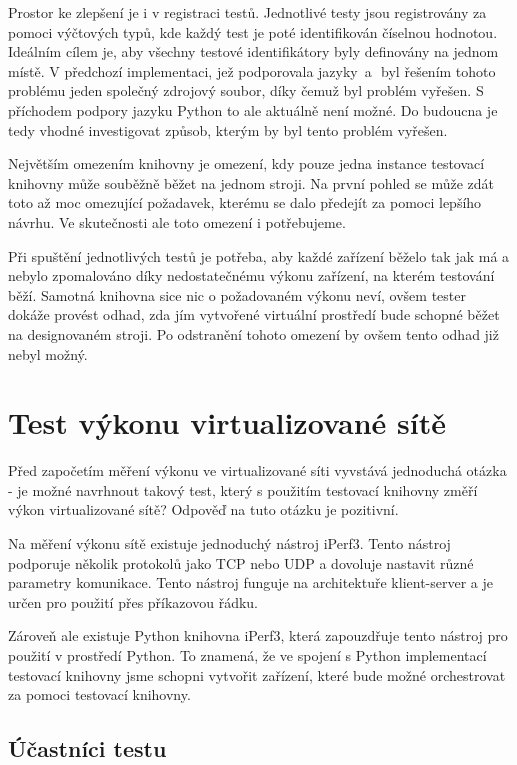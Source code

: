 Prostor ke zlepšení je i v registraci testů. Jednotlivé testy jsou registrovány za pomoci výčtových typů, kde každý test je poté identifikován číselnou hodnotou. Ideálním cílem je, aby všechny testové identifikátory byly definovány na jednom místě. V předchozí implementaci, jež podporovala jazyky \csharp\,a\,\cpp\, byl řešením tohoto problému jeden společný zdrojový soubor, díky čemuž byl problém vyřešen. S příchodem podpory jazyku Python to ale aktuálně není možné. Do budoucna je tedy vhodné investigovat způsob, kterým by byl tento problém vyřešen.

Největším omezením knihovny je omezení, kdy pouze jedna instance testovací knihovny může souběžně běžet na jednom stroji. Na první pohled se může zdát toto až moc omezující požadavek, kterému se dalo předejít za pomoci lepšího návrhu. Ve skutečnosti ale toto omezení i potřebujeme. 

Při spuštění jednotlivých testů je potřeba, aby každé zařízení běželo tak jak má a nebylo zpomalováno díky nedostatečnému výkonu zařízení, na kterém testování běží. Samotná knihovna sice nic o požadovaném výkonu neví, ovšem tester dokáže provést odhad, zda jím vytvořené virtuální prostředí bude schopné běžet na designovaném stroji. Po odstranění tohoto omezení by ovšem tento odhad již nebyl možný.


\section{Test výkonu virtualizované sítě}

Před započetím měření výkonu ve virtualizované síti vyvstává jednoduchá otázka - je možné navrhnout takový test, který s použitím testovací knihovny změří výkon virtualizované sítě? Odpověď na tuto otázku je pozitivní. 

Na měření výkonu sítě existuje jednoduchý nástroj iPerf3. Tento nástroj podporuje několik protokolů jako TCP nebo UDP a dovoluje nastavit různé parametry komunikace. Tento nástroj funguje na architektuře klient-server a je určen pro použití přes příkazovou řádku.

Zároveň ale existuje Python knihovna iPerf3, která zapouzdřuje tento nástroj pro použití v prostředí Python. To znamená, že ve spojení s Python implementací testovací knihovny jsme schopni vytvořit zařízení, které bude možné orchestrovat za pomoci testovací knihovny.

\subsection{Účastníci testu}

